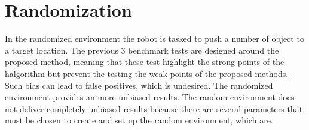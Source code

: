 %
%
%
%

\section{Randomization}%
\label{sec:randomisation}
In the randomized environment the robot is tasked to push a number of object to a target location. The previous 3 benchmark tests are designed around the proposed method, meaning that these test highlight the strong points of the \ac{halgorithm} but prevent the testing the weak points of the proposed methods. Such bias can lead to false positives, which is undesired. The randomized environment provides an more unbiased results. The random environment does not deliver completely unbiased results because there are several parameters that must be chosen to create and set up the random environment, which are.\\

